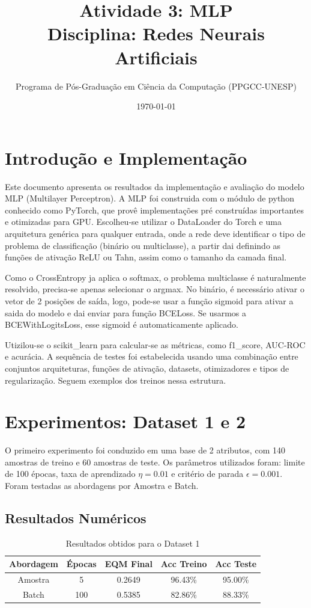 \documentclass[12pt,a4paper]{article}
\title{Atividade 3: MLP \\ \large Disciplina: Redes Neurais Artificiais}
\author{Programa de Pós-Graduação em Ciência da Computação (PPGCC-UNESP)}
\date{\today}
\begin{document}
\maketitle

\section{Introdução e Implementação}
Este documento apresenta os resultados da implementação e avaliação do modelo MLP (Multilayer Perceptron). A MLP foi construida com o módulo de python conhecido como PyTorch, que provê implementações pré construídas importantes e otimizadas para GPU. Escolheu-se utilizar o DataLoader do Torch e uma arquitetura genérica para qualquer entrada, onde a rede deve identificar o tipo de problema de classificação (binário ou multiclasse), a partir dai definindo as funções de ativação ReLU ou Tahn, assim como o tamanho da camada final.

Como o CrossEntropy ja aplica o softmax, o problema multiclasse é naturalmente resolvido, precisa-se apenas selecionar o argmax. No binário, é necessário ativar o vetor de 2 posições de saída, logo, pode-se usar a função sigmoid para ativar a saida do modelo e dai enviar para função BCELoss. Se usarmos a BCEWithLogitsLoss, esse sigmoid é automaticamente aplicado.


Utizilou-se o scikit\_learn para calcular-se as métricas, como f1\_score, AUC-ROC e acurácia. A sequência de testes foi estabelecida usando uma combinação entre conjuntos arquiteturas, funções de ativação, datasets, otimizadores e tipos de regularização. Seguem exemplos dos treinos nessa estrutura.


\section{Experimentos: Dataset 1 e 2}
O primeiro experimento foi conduzido em uma base de 2 atributos, com 140 amostras de treino e 60 amostras de teste. Os parâmetros utilizados foram: limite de 100 épocas, taxa de aprendizado $\eta = 0.01$ e critério de parada $\epsilon = 0.001$. Foram testadas as abordagens por Amostra e Batch.

\subsection{Resultados Numéricos}
\begin{table}[H]
\centering
\begin{tabular}{|c|c|c|c|c|}
\hline
\textbf{Abordagem} & \textbf{Épocas} & \textbf{EQM Final} & \textbf{Acc Treino} & \textbf{Acc Teste} \\ \hline
Amostra & 5 & 0.2649 & 96.43\% & 95.00\% \\ \hline
Batch & 100 & 0.5385 & 82.86\% & 88.33\% \\ \hline
\end{tabular}
\caption{Resultados obtidos para o Dataset 1}
\end{table}
\end{document}
